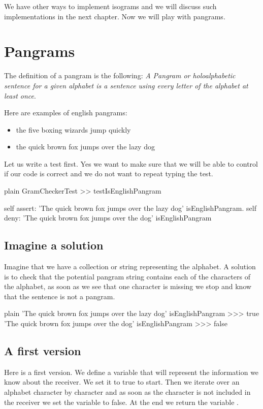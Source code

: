 \documentclass[10pt,twoside,english]{_support/latex/sbabook/sbabook}
\begin{document}
We have other ways to implement isograms and we will discuss such implementations in the next chapter. Now we will play with pangrams.
\section{Pangrams}
 
The definition of a pangram is the following:  \textit{A Pangram or holoalphabetic sentence for a given alphabet is a sentence using every letter of the alphabet at least once}.
 
Here are examples of english pangrams: 

\begin{itemize}
\item the five boxing wizards jump quickly
\item the quick brown fox jumps over the lazy dog
\end{itemize}

Let us write a test first. Yes we want to make sure that we will be able to control if our code is correct and we do not want to repeat typing the test. 

\begin{displaycode}{plain}
GramCheckerTest >> testIsEnglishPangram

	self assert: 'The quick brown fox jumps over the lazy dog' isEnglishPangram.
	self deny: 'The quick brown fox jumps over the  dog' isEnglishPangram
\end{displaycode}
\subsection{Imagine a solution}
Imagine that we have a collection or string representing the alphabet.
A solution is to check that the potential pangram string contains each of the characters of the alphabet, as soon as we see that one character is missing we stop and know that the sentence is not a pangram. 

\begin{displaycode}{plain}
'The quick brown fox jumps over the lazy dog' isEnglishPangram
>>> true
'The quick brown fox jumps over the dog' isEnglishPangram
>>> false
\end{displaycode}
\subsection{A first version}
Here is a first version. We define a variable  that will represent the information we know about the receiver. We set it to true to start. Then we iterate over an alphabet character by character and as soon as the character is not included in the receiver we set the variable to false. 
At the end we return the variable .  
\end{document}
